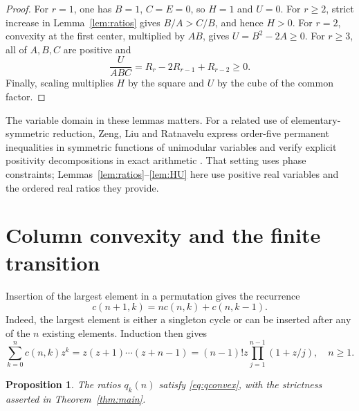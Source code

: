 \documentclass[11pt,a4paper]{article}
\newtheorem{proposition}[theorem]{Proposition}
\theoremstyle{remark}
\begin{document}
\begin{proof}
For $r=1$, one has $B=1$, $C=E=0$, so $H=1$ and $U=0$.
For $r\geq2$, strict increase in Lemma~\ref{lem:ratios} gives
$B/A>C/B$, and hence $H>0$.
For $r=2$, convexity at the first center, multiplied by $AB$, gives
$U=B^2-2A\geq0$. For $r\geq3$, all of $A,B,C$ are positive and
\[
 \frac{U}{ABC}=R_r-2R_{r-1}+R_{r-2}\geq0.
\]
Finally, scaling multiplies $H$ by the square and $U$ by the cube
of the common factor.
\end{proof}

The variable domain in these lemmas matters. For a related use of
elementary-symmetric reduction, Zeng, Liu and Ratnavelu express order-five
permanent inequalities in symmetric functions of unimodular variables
and verify explicit positivity decompositions in exact arithmetic
\cite{ZengLiuRatnavelu2026}. That setting uses phase
constraints; Lemmas~\ref{lem:ratios}--\ref{lem:HU} here use positive real
variables and the ordered real ratios they provide.

\section{Column convexity and the finite transition}

Insertion of the largest element in a permutation gives the recurrence
\begin{equation}\label{eq:recurrence}
 c(n+1,k)=nc(n,k)+c(n,k-1).
\end{equation}
Indeed, the largest element is either a singleton cycle or can be inserted
after any of the $n$ existing elements. Induction then gives
\begin{equation}\label{eq:product}
 \sum_{k=0}^n c(n,k)z^k
 =z(z+1)\cdots(z+n-1)
 =(n-1)!z\prod_{j=1}^{n-1}(1+z/j),\quad n\geq1.
\end{equation}

\begin{proposition}\label{prop:column}
The ratios $q_k(n)$ satisfy \eqref{eq:qconvex}, with the strictness
asserted in Theorem~\ref{thm:main}.
\end{proposition}
\end{document}

